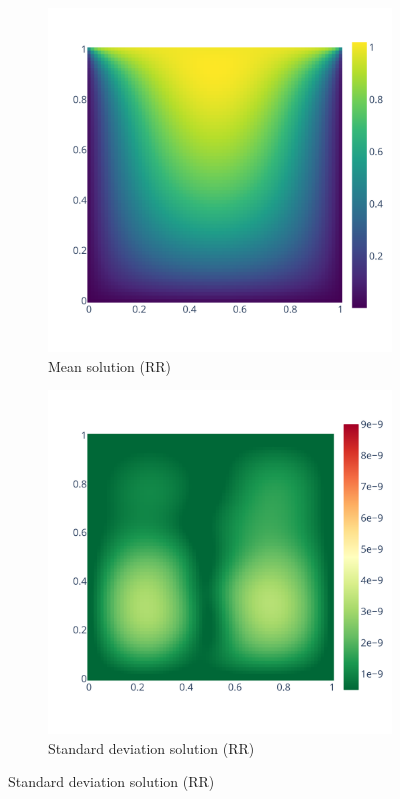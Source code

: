 \documentclass[11pt]{article}
\begin{document}
\begin{figure}
    \centering
    \begin{subfigure}{0.45\linewidth}
    \includegraphics[width=\linewidth]{figure/root_finding/solution_mean_RR.pdf}
    \caption{Mean solution (RR)}
    \label{fig:mean_solution_rr}
    \end{subfigure}
    \begin{subfigure}{0.45\linewidth}
    \includegraphics[width=\linewidth]{figure/root_finding/solution_std_RR.pdf}
    \caption{Standard deviation solution (RR)}
    \label{fig:stdev_rr}
    \end{subfigure}
    

\end{figure}
\end{document}
